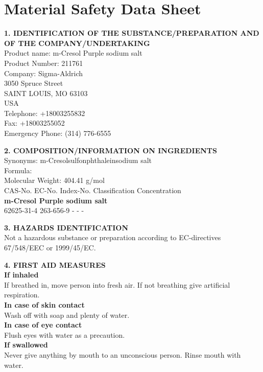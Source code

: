 \section*{Material Safety Data Sheet}
\label{sec:MSDS}


\setlength{\columnsep}{30pt}
\begin{multicols*}{2}
\begin{flushleft}

\begin{sans}

\textbf{1. IDENTIFICATION OF THE SUBSTANCE/PREPARATION AND OF THE COMPANY/UNDERTAKING}\\
Product name: m-Cresol Purple sodium salt\\
Product Number: 211761\\
Company: Sigma-Aldrich\\
3050 Spruce Street\\
SAINT LOUIS, MO 63103\\
USA\\
Telephone: +18003255832\\
Fax: +18003255052\\
Emergency Phone: (314) 776-6555

\textbf{2. COMPOSITION/INFORMATION ON INGREDIENTS}\\
Synonyms: m-Cresolsulfonphthaleinsodium salt\\
Formula: \\
Molecular Weight: 404.41 g/mol\\
CAS-No. EC-No. Index-No. Classification Concentration\\
\textbf{m-Cresol Purple sodium salt}\\
62625-31-4 263-656-9 - - -

\textbf{3. HAZARDS IDENTIFICATION}\\
Not a hazardous substance or preparation according to EC-directives 67/548/EEC or 1999/45/EC.

\textbf{4. FIRST AID MEASURES}\\
\textbf{If inhaled}\\
If breathed in, move person into fresh air. If not breathing give artificial respiration.\\
\textbf{In case of skin contact}\\
Wash off with soap and plenty of water.\\
\textbf{In case of eye contact}\\
Flush eyes with water as a precaution.\\
\textbf{If swallowed}\\
Never give anything by mouth to an unconscious person. Rinse mouth with water.


\end{sans}
\end{flushleft}
\end{multicols*}
